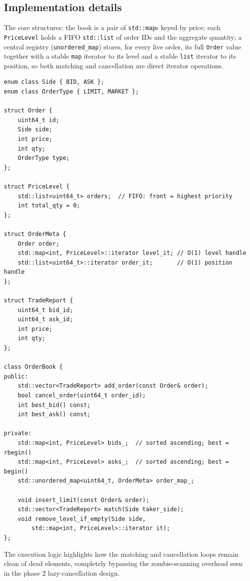 \documentclass[11pt,a4paper]{article}
\begin{document}
\subsection{Implementation details}

The core structures: the book is a pair of \texttt{std::map}s keyed by
price; each \texttt{PriceLevel} holds a FIFO \texttt{std::list} of order
IDs and the aggregate quantity; a central registry
(\texttt{unordered\_map}) stores, for every live order, its full
\texttt{Order} value together with a stable \texttt{map} iterator to its
level and a stable \texttt{list} iterator to its position, so both matching
and cancellation are direct iterator operations.

\begin{lstlisting}[caption={Phase 3 order book data structures
(\texttt{orderbook.h})}]
enum class Side { BID, ASK };
enum class OrderType { LIMIT, MARKET };

struct Order {
    uint64_t id;
    Side side;
    int price;
    int qty;
    OrderType type;
};

struct PriceLevel {
    std::list<uint64_t> orders;  // FIFO: front = highest priority
    int total_qty = 0;
};

struct OrderMeta {
    Order order;
    std::map<int, PriceLevel>::iterator level_it; // O(1) level handle
    std::list<uint64_t>::iterator order_it;       // O(1) position handle
};

struct TradeReport {
    uint64_t bid_id;
    uint64_t ask_id;
    int price;
    int qty;
};

class OrderBook {
public:
    std::vector<TradeReport> add_order(const Order& order);
    bool cancel_order(uint64_t order_id);
    int best_bid() const;
    int best_ask() const;

private:
    std::map<int, PriceLevel> bids_;  // sorted ascending; best = rbegin()
    std::map<int, PriceLevel> asks_;  // sorted ascending; best = begin()
    std::unordered_map<uint64_t, OrderMeta> order_map_;

    void insert_limit(const Order& order);
    std::vector<TradeReport> match(Side taker_side);
    void remove_level_if_empty(Side side,
        std::map<int, PriceLevel>::iterator it);
};
\end{lstlisting}

The execution logic highlights how the matching and cancellation loops
remain clean of dead elements, completely bypassing the zombie-scanning
overhead seen in the phase 2 lazy-cancellation design.
\end{document}
